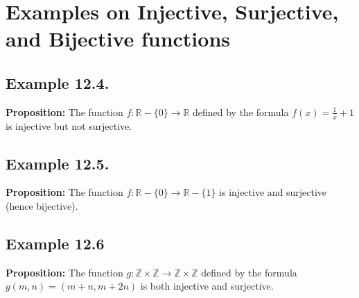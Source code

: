 \documentclass[
]{article}
\author{}
\date{}
\begin{document}
\hypertarget{examples-on-injective-surjective-and-bijective-functions}{%
\section{Examples on Injective, Surjective, and Bijective
functions}\label{examples-on-injective-surjective-and-bijective-functions}}

\hypertarget{example-12.4.}{%
\subsection{Example 12.4.}\label{example-12.4.}}

\textbf{Proposition:} The function \(f:\mathbb{R}-\{0\}\to\mathbb{R}\)
defined by the formula \(f(x)=\frac{1}{x}+1\) is injective but not
surjective.

\vfill\eject

\hypertarget{example-12.5.}{%
\subsection{Example 12.5.}\label{example-12.5.}}

\textbf{Proposition:} The function
\(f:\mathbb{R}-\{0\}\to\mathbb{R}-\{1\}\) is injective and surjective
(hence bijective).

\vfill\eject

\hypertarget{example-12.6}{%
\subsection{Example 12.6}\label{example-12.6}}

\textbf{Proposition:} The function
\(g:\mathbb{Z}\times\mathbb{Z}\to\mathbb{Z}\times\mathbb{Z}\) defined by
the formula \(g(m,n) = (m+n,m+2n)\) is both injective and surjective.

\vfill\eject
\end{document}
